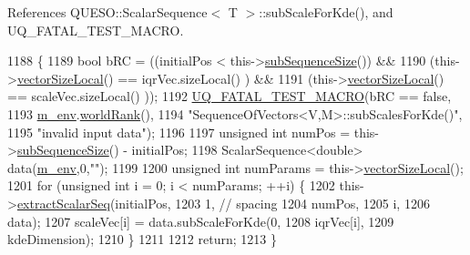 References Q\-U\-E\-S\-O\-::\-Scalar\-Sequence$<$ T $>$\-::sub\-Scale\-For\-Kde(), and U\-Q\-\_\-\-F\-A\-T\-A\-L\-\_\-\-T\-E\-S\-T\-\_\-\-M\-A\-C\-R\-O.


\begin{DoxyCode}
1188 \{
1189   \textcolor{keywordtype}{bool} bRC = ((initialPos              <  this->\hyperlink{class_q_u_e_s_o_1_1_sequence_of_vectors_a0224bd3e961d86af5d2886301c0c2b86}{subSequenceSize}()) &&
1190               (this->\hyperlink{class_q_u_e_s_o_1_1_base_vector_sequence_a2fefedf9e5b90f22881103b3f92555f6}{vectorSizeLocal}() == iqrVec.sizeLocal()     ) &&
1191               (this->\hyperlink{class_q_u_e_s_o_1_1_base_vector_sequence_a2fefedf9e5b90f22881103b3f92555f6}{vectorSizeLocal}() == scaleVec.sizeLocal()   ));
1192   \hyperlink{_defines_8h_a56d63d18d0a6d45757de47fcc06f574d}{UQ\_FATAL\_TEST\_MACRO}(bRC == \textcolor{keyword}{false},
1193                       \hyperlink{class_q_u_e_s_o_1_1_base_vector_sequence_a8e8824d2a63c5a43bcc6473e3a0491e8}{m\_env}.\hyperlink{class_q_u_e_s_o_1_1_base_environment_a78b57112bbd0e6dd0e8afec00b40ffa7}{worldRank}(),
1194                       \textcolor{stringliteral}{"SequenceOfVectors<V,M>::subScalesForKde()"},
1195                       \textcolor{stringliteral}{"invalid input data"});
1196 
1197   \textcolor{keywordtype}{unsigned} \textcolor{keywordtype}{int} numPos = this->\hyperlink{class_q_u_e_s_o_1_1_sequence_of_vectors_a0224bd3e961d86af5d2886301c0c2b86}{subSequenceSize}() - initialPos;
1198   ScalarSequence<double> data(\hyperlink{class_q_u_e_s_o_1_1_base_vector_sequence_a8e8824d2a63c5a43bcc6473e3a0491e8}{m\_env},0,\textcolor{stringliteral}{""});
1199 
1200   \textcolor{keywordtype}{unsigned} \textcolor{keywordtype}{int} numParams = this->\hyperlink{class_q_u_e_s_o_1_1_base_vector_sequence_a2fefedf9e5b90f22881103b3f92555f6}{vectorSizeLocal}();
1201   \textcolor{keywordflow}{for} (\textcolor{keywordtype}{unsigned} \textcolor{keywordtype}{int} i = 0; i < numParams; ++i) \{
1202     this->\hyperlink{class_q_u_e_s_o_1_1_sequence_of_vectors_ac977b3b26a6af2ae727671f1246262fd}{extractScalarSeq}(initialPos,
1203                            1, \textcolor{comment}{// spacing}
1204                            numPos,
1205                            i,
1206                            data);
1207     scaleVec[i] = data.subScaleForKde(0,
1208                                       iqrVec[i],
1209                                       kdeDimension);
1210   \}
1211 
1212   \textcolor{keywordflow}{return};
1213 \}
\end{DoxyCode}
